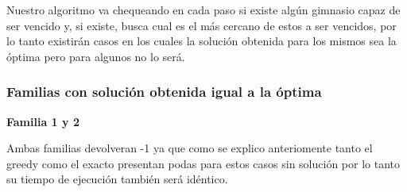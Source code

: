Nuestro algoritmo va chequeando en cada paso si existe alg\'un gimnasio capaz de ser vencido y, si existe, busca cual es el m\'as cercano de estos a ser vencidos, por lo tanto existir\'an casos en los cuales la soluci\'on obtenida para los mismos sea la \'optima pero para algunos no lo ser\'a.

\subsubsection*{Familias con soluci\'on obtenida igual a la \'optima}


\begin{center}
\textbf{Familia 1 y 2}
\end{center}

Ambas familias devolveran -1 ya que como se explico anteriomente tanto el greedy como el exacto presentan podas para estos casos sin soluci\'on por lo tanto su tiempo de ejecuci\'on tambi\'en ser\'a id\'entico. \\\\\\\\\\\\\\\\\\\



